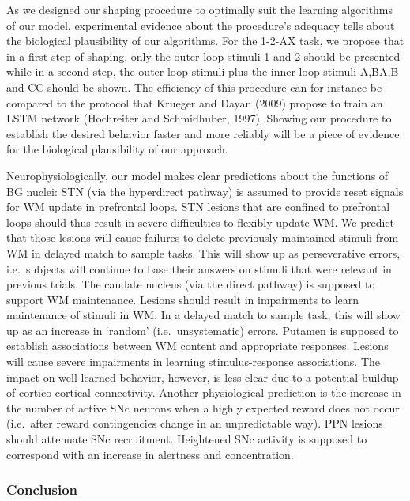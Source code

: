 \documentclass[
  11pt,
  a4paper,
]{scrbook}
\begin{document}
As we designed our shaping procedure to optimally suit the learning
algorithms of our model, experimental evidence about the procedure's
adequacy tells about the biological plausibility of our algorithms. For
the 1-2-AX task, we propose that in a first step of shaping, only the
outer-loop stimuli 1 and 2 should be presented while in a second step,
the outer-loop stimuli plus the inner-loop stimuli A,BA,B and CC should
be shown. The efficiency of this procedure can for instance be compared
to the protocol that Krueger and Dayan (2009) propose to train an LSTM
network (Hochreiter and Schmidhuber, 1997). Showing our procedure to
establish the desired behavior faster and more reliably will be a piece
of evidence for the biological plausibility of our approach.

Neurophysiologically, our model makes clear predictions about the
functions of BG nuclei: STN (via the hyperdirect pathway) is assumed to
provide reset signals for WM update in prefrontal loops. STN lesions
that are confined to prefrontal loops should thus result in severe
difficulties to flexibly update WM. We predict that those lesions will
cause failures to delete previously maintained stimuli from WM in
delayed match to sample tasks. This will show up as perseverative
errors, i.e.~subjects will continue to base their answers on stimuli
that were relevant in previous trials. The caudate nucleus (via the
direct pathway) is supposed to support WM maintenance. Lesions should
result in impairments to learn maintenance of stimuli in WM. In a
delayed match to sample task, this will show up as an increase in
`random' (i.e.~unsystematic) errors. Putamen is supposed to establish
associations between WM content and appropriate responses. Lesions will
cause severe impairments in learning stimulus-response associations. The
impact on well-learned behavior, however, is less clear due to a
potential buildup of cortico-cortical connectivity. Another
physiological prediction is the increase in the number of active SNc
neurons when a highly expected reward does not occur (i.e.~after reward
contingencies change in an unpredictable way). PPN lesions should
attenuate SNc recruitment. Heightened SNc activity is supposed to
correspond with an increase in alertness and concentration.

\subsubsection*{Conclusion}\label{conclusion-1}
\end{document}
